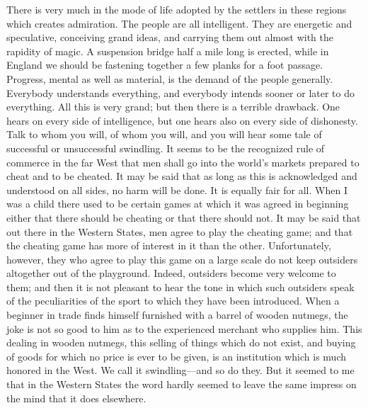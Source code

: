 There is very much in the mode of life adopted by the settlers in
these regions which creates admiration.  The people are all
intelligent.  They are energetic and speculative, conceiving grand
ideas, and carrying them out almost with the rapidity of magic.  A
suspension bridge half a mile long is erected, while in England we
should be fastening together a few planks for a foot passage.
Progress, mental as well as material, is the demand of the people
generally.  Everybody understands everything, and everybody intends
sooner or later to do everything.  All this is very grand; but then
there is a terrible drawback.  One hears on every side of
intelligence, but one hears also on every side of dishonesty.  Talk
to whom you will, of whom you will, and you will hear some tale of
successful or unsuccessful swindling.  It seems to be the
recognized rule of commerce in the far West that men shall go into
the world's markets prepared to cheat and to be cheated.  It may be
said that as long as this is acknowledged and understood on all
sides, no harm will be done.  It is equally fair for all.  When I
was a child there used to be certain games at which it was agreed
in beginning either that there should be cheating or that there
should not.  It may be said that out there in the Western States,
men agree to play the cheating game; and that the cheating game has
more of interest in it than the other.  Unfortunately, however,
they who agree to play this game on a large scale do not keep
outsiders altogether out of the playground.  Indeed, outsiders
become very welcome to them; and then it is not pleasant to hear
the tone in which such outsiders speak of the peculiarities of the
sport to which they have been introduced.  When a beginner in trade
finds himself furnished with a barrel of wooden nutmegs, the joke
is not so good to him as to the experienced merchant who supplies
him.  This dealing in wooden nutmegs, this selling of things which
do not exist, and buying of goods for which no price is ever to be
given, is an institution which is much honored in the West.  We
call it swindling---and so do they.  But it seemed to me that in the
Western States the word hardly seemed to leave the same impress on
the mind that it does elsewhere.

